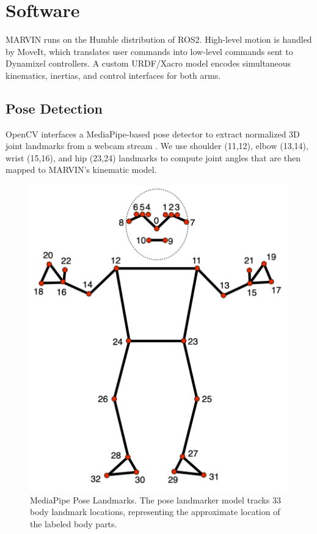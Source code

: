 \documentclass[sigconf]{acmart}
\begin{document}
\section{Software}
MARVIN runs on the Humble distribution of ROS2. High-level motion is handled by MoveIt, which translates user commands into low-level commands sent to Dynamixel controllers. A custom URDF/Xacro model encodes simultaneous kinematics, inertias, and control interfaces for both arms.

\subsection{Pose Detection}
OpenCV interfaces a MediaPipe-based pose detector to extract normalized 3D joint landmarks from a webcam stream \cite{noauthor_mediapipe_nodate}. We use shoulder (11,12), elbow (13,14), wrist (15,16), and hip (23,24) landmarks to compute joint angles that are then mapped to MARVIN's kinematic model.

\begin{figure}[htbp]
  \centering
  \includegraphics[width=\linewidth]{assets/pose-landmarks.png}
  \caption{MediaPipe Pose Landmarks. The pose landmarker model tracks 33 body landmark locations, representing the approximate location of the labeled body parts.}
  \label{fig:pose-landmarks}
\end{figure}
\end{document}
